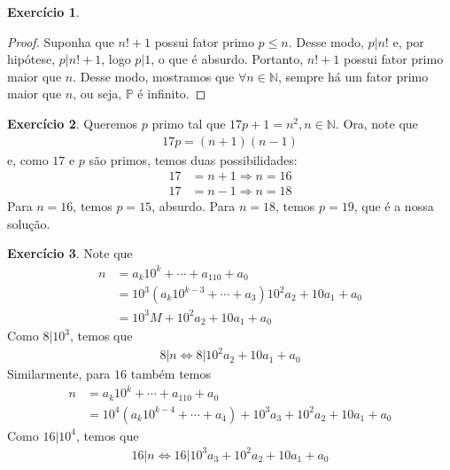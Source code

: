 \documentclass[a4paper,12pt]{article}
\theoremstyle{definition}
\newtheorem{exercise}{Exercício}%
\begin{document}
	\begin{exercise}
		\begin{proof}
			Suponha que $n! + 1$ possui fator primo $p\leq n$. Desse modo, $p|n!$ e, por hipótese, $p|n!+1$, logo $p|1$, o que é absurdo. Portanto, $n!+1$ possui fator primo maior que $n$. Desse modo, mostramos que $\forall n\in\mathbb{N}$, sempre há um fator primo maior que $n$, ou seja, $\mathbb{P}$ é infinito.
		\end{proof}
	\end{exercise}
	\begin{exercise}
		Queremos $p$ primo tal que $17p + 1 = n^2, n\in\mathbb{N}$. Ora, note que
		\begin{align*}
		17p = (n+1)(n-1)
		\end{align*}
		e, como $17$ e $p$ são primos, temos duas possibilidades:
		\begin{align*}
		17 &= n + 1 \Rightarrow n = 16 \\
		17 &= n - 1 \Rightarrow n = 18
		\end{align*}
		Para $n=16$, temos $p = 15$, absurdo. Para $n=18$, temos $p=19$, que é a nossa solução.
	\end{exercise}
	\begin{exercise}
		Note que
		\begin{align*}
		n &= a_k10^k + \cdots + a_110 + a_0 \\
		&= 10^3(a_k10^{k-3} + \cdots + a_3) 10^2a_2 + 10a_1 + a_0 \\
		&= 10^3M + 10^2a_2 + 10a_1 + a_0
		\end{align*}
		Como $8|10^3$, temos que 
		\begin{align*}
		8|n \Leftrightarrow 8|10^2a_2 + 10a_1 + a_0
		\end{align*}
		Similarmente, para $16$ também temos
		\begin{align*}
		n &= a_k10^k + \cdots + a_110 + a_0 \\
		&= 10^4(a_k10^{k-4} + \cdots + a_4) + 10^3a_3 + 10^2a_2 + 10a_1 + a_0 
		\end{align*}
		Como $16|10^4$, temos que
		\begin{align*}
		16|n \Leftrightarrow 16|10^3a_3 + 10^2a_2 + 10a_1 + a_0
		\end{align*}
	\end{exercise}
\end{document}
